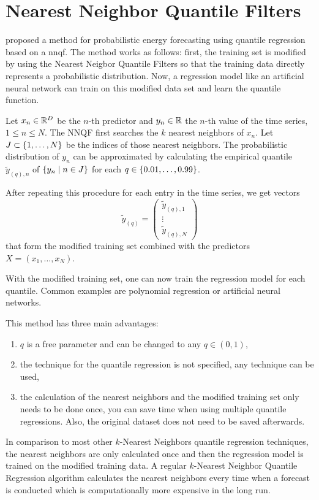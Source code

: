 \section{Nearest Neighbor Quantile Filters}
\label{sec:nnqf}

\Textcite{Ordiano2019} proposed a method for probabilistic 
energy forecasting using quantile regression based on a \gls{nnqf}. 
The method works as follows: first, the training set is modified 
by using the Nearest Neigbor Quantile Filters so that 
the training data directly represents a probabilistic distribution. 
Now, a regression model like an artificial neural network can 
train on this modified data set and learn the quantile function.

Let \(x_n \in \mathbb{R}^D\) be the \(n\)-th predictor 
and \(y_n \in \mathbb{R}\) the \(n\)-th value of the time series, \(1 \leq n \leq N\). 
The NNQF first searches the \(k\) nearest neighbors of \(x_n\). 
Let \(J \subset \{1, \ldots, N\}\) be the indices of 
those nearest neighbors. 
The probabilistic distribution of \(y_n\) can be approximated 
by calculating the empirical quantile \(\tilde{y}_{(q),n}\) of 
\(\{y_n \;|\; n\in J\}\) for each \(q \in \{0.01, \ldots, 0.99\}\). 

After repeating this procedure for each entry in the time series, 
we get vectors 
\[ \tilde{y}_{(q)} = \begin{pmatrix}
    \tilde{y}_{(q), 1} \\ 
    \vdots \\
    \tilde{y}_{(q), N}
\end{pmatrix} \]
that form the modified training set combined with the 
predictors \(X = (x_1, \ldots, x_N)\).

With the modified training set, one can now train the regression model 
for each quantile. Common examples are polynomial regression or 
artificial neural networks. 

This method has three main advantages: 
\begin{enumerate}
    \item \(q\) is a free parameter and can be changed to any \(q \in (0,1)\),
    \item the technique for the quantile regression is not specified, 
    any technique can be used,
    \item the calculation of the nearest neighbors and the modified 
    training set only needs to be done once, you can save time when 
    using multiple quantile regressions. Also, the original dataset 
    does not need to be saved afterwards.
\end{enumerate}

In comparison to most other \(k\)-Nearest Neighbors quantile 
regression techniques, the nearest neighbors are only calculated once 
and then the regression model is trained on the modified training data. 
A regular \(k\)-Nearest Neighbor Quantile Regression algorithm 
calculates the nearest neighbors every time when a forecast is conducted 
which is computationally more expensive in the long run.